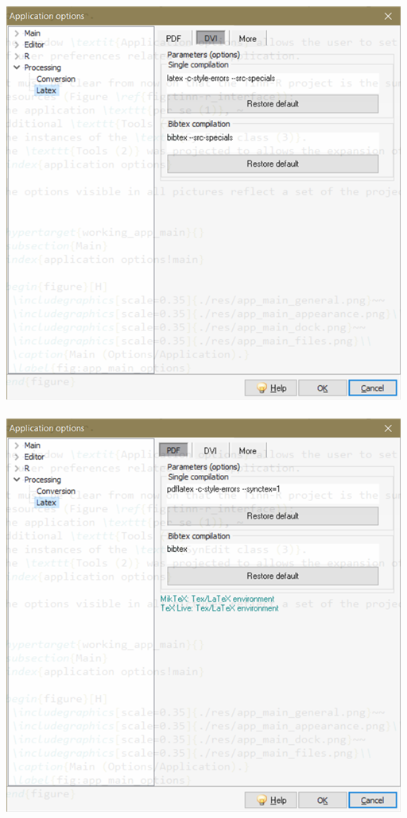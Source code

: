 \vspace{5mm}
\includegraphics[scale=0.45]{./res/app_processing_latex_dvi.png}~~
\includegraphics[scale=0.45]{./res/app_processing_latex_pdf.png}~~

